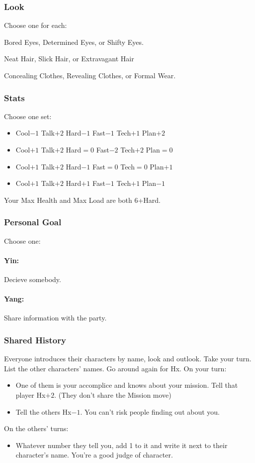 \subsubsection{Look}
Choose one for each:

Bored Eyes, Determined Eyes, or Shifty Eyes.

Neat Hair, Slick Hair, or Extravagant Hair

Concealing Clothes, Revealing Clothes, or Formal Wear.

\subsubsection{Stats}
Choose one set:
\begin{itemize}
\setlength\itemsep{0em}
\item Cool$-1$ Talk$+2$ Hard$-1$ Fast$-1$ Tech$+1$ Plan$+2$
\item Cool$+1$ Talk$+2$ Hard${=}0$ Fast$-2$ Tech$+2$ Plan${=}0$
\item Cool$+1$ Talk$+2$ Hard$-1$ Fast${=}0$ Tech${=}0$ Plan$+1$
\item Cool$+1$ Talk$+2$ Hard$+1$ Fast$-1$ Tech$+1$ Plan$-1$
\end{itemize}

Your Max Health and Max Load are both 6+Hard.

\subsubsection{Personal Goal}
Choose one:
\paragraph{Yin:} Decieve somebody.
\paragraph{Yang:} Share information with the party.

\subsubsection{Shared History}
Everyone introduces their characters by name, look and outlook. Take
your turn. List the other characters' names. Go around again for
Hx. On your turn:
\begin{itemize} %
\item One of them is your accomplice and knows about your
  mission. Tell that player Hx$+2$. (They don't share the Mission move)
\item Tell the others Hx$-1$. You can't risk people finding out about you.
\end{itemize}
On the others’ turns:
\begin{itemize} %
\item Whatever number they tell you, add 1 to it and write it next to their
  character’s name. You're a good judge of character.
\end{itemize}

